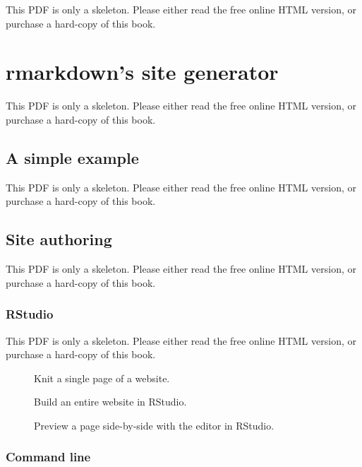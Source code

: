 \documentclass[
  11pt,
]{krantz}
\theoremstyle{definition}
\theoremstyle{definition}
\theoremstyle{definition}
\theoremstyle{definition}
\theoremstyle{remark}
\begin{document}
This PDF is only a skeleton. Please either read the free online HTML version, or purchase a hard-copy of this book.

\section{rmarkdown's site generator}\label{rmarkdown-site}

This PDF is only a skeleton. Please either read the free online HTML version, or purchase a hard-copy of this book.

\subsection{A simple example}\label{a-simple-example}

This PDF is only a skeleton. Please either read the free online HTML version, or purchase a hard-copy of this book.

\subsection{Site authoring}\label{site-authoring}

This PDF is only a skeleton. Please either read the free online HTML version, or purchase a hard-copy of this book.

\subsubsection{RStudio}\label{rstudio}

This PDF is only a skeleton. Please either read the free online HTML version, or purchase a hard-copy of this book.

\begin{figure}\caption{Knit a single page of a website.}\end{figure}

\begin{figure}\caption{Build an entire website in RStudio.}\end{figure}

\begin{figure}\caption{Preview a page side-by-side with the editor in RStudio.}\end{figure}

\subsubsection{Command line}\label{command-line}
\end{document}
